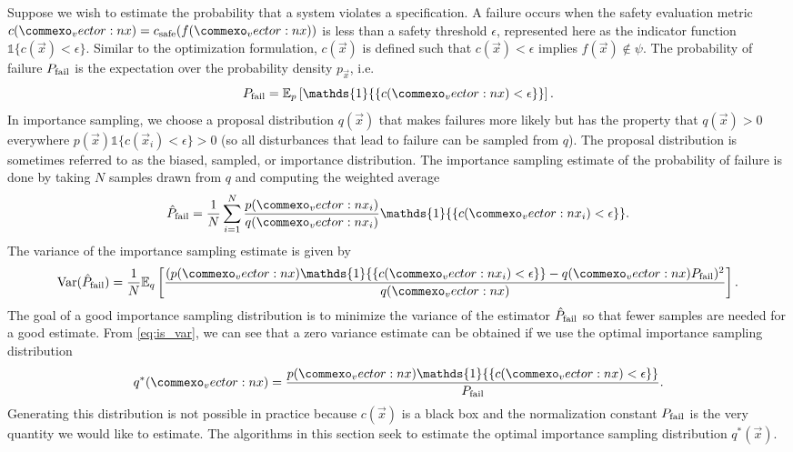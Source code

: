 Suppose we wish to estimate the probability that a system violates a specification. A failure occurs when the safety evaluation metric $c(\vec{x}) = c_{\rm safe}(f(\vec{x}))$ is less than a safety threshold $\epsilon$, represented here as the indicator function $\mathds{1}{\{ c(\vec{x}) < \epsilon \}}$. Similar to the optimization formulation, $c(\vec{x})$ is defined such that $c(\vec{x}) < \epsilon$ implies $f(\vec{x}) \not \in \psi$. The probability of failure $P_{\rm fail}$ is the expectation over the probability density $p_{\vec{x}}$, i.e.
\begin{equation}
    P_{\rm fail} = \mathbb{E}_{p}\left[ \mathds{1}{\{ c(\vec{x}) < \epsilon \}} \right] \text{.}
\end{equation} 
In importance sampling, we choose a proposal distribution $q(\vec{x})$ that makes failures more likely but has the property that $q(\vec{x}) > 0$ everywhere $p(\vec{x})\mathds{1}\{ c(\vec{x}_i) < \epsilon \} > 0$ (so all disturbances that lead to failure can be sampled from $q$). The proposal distribution is sometimes referred to as the biased, sampled, or importance distribution. The importance sampling estimate of the probability of failure is done by taking $N$ samples drawn from $q$ and computing the weighted average
\begin{equation}
    \hat{P}_{\rm fail} = \frac{1}{N} \sum_{i=1}^N \frac{p(\vec{x}_i)}{q(\vec{x}_i)} \mathds{1}{\{ c(\vec{x}_i) < \epsilon \}} \text{.} \label{eq:is_est}
\end{equation}
The variance of the importance sampling estimate is given by 
\begin{equation}
    {\rm Var}(\hat{P}_{\rm fail}  ) = \frac{1}{N} \mathbb{E}_q \left[ \frac{(p(\vec{x})\mathds{1}{\{ c(\vec{x}_i) < \epsilon \}}  - q(\vec{x})P_{\rm fail})^2}{q(\vec{x})} \right] \text{.} \label{eq:is_var}
\end{equation}
The goal of a good importance sampling distribution is to minimize the variance of the estimator $\hat{P}_{\rm fail} $ so that fewer samples are needed for a good estimate. From \cref{eq:is_var}, we can see that a zero variance estimate can be obtained if we use the optimal importance sampling distribution
\begin{equation}
    q^*(\vec{x}) = \frac{p(\vec{x}) \mathds{1}{\{ c(\vec{x}) < \epsilon \}}} {P_{\rm fail}} \text{.}
\end{equation}
Generating this distribution is not possible in practice because $c(\vec{x})$ is a black box and the normalization constant $P_{\rm fail}$ is the very quantity we would like to estimate. The algorithms in this section seek to estimate the optimal importance sampling distribution $q^*(\vec{x})$.

